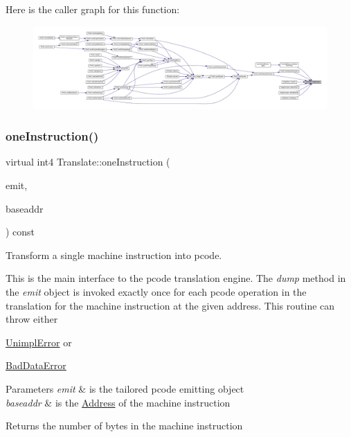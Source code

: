 Here is the caller graph for this function\+:
\nopagebreak
\begin{figure}[H]
\begin{center}
\leavevmode
\includegraphics[width=350pt]{class_translate_acd3fd0f02883a26e882c46872324adb8_icgraph}
\end{center}
\end{figure}
\mbox{\label{class_translate_a1737782c38ee43de62ae2e7572321fc9}} 
\subsubsection{\texorpdfstring{oneInstruction()}{oneInstruction()}}
{\footnotesize\ttfamily virtual int4 Translate\+::one\+Instruction (\begin{DoxyParamCaption}\item[{\mbox{\hyperlink{class_pcode_emit}{Pcode\+Emit}} \&}]{emit,  }\item[{const \mbox{\hyperlink{class_address}{Address}} \&}]{baseaddr }\end{DoxyParamCaption}) const\hspace{0.3cm}{\ttfamily [pure virtual]}}



Transform a single machine instruction into pcode. 

This is the main interface to the pcode translation engine. The {\itshape dump} method in the {\itshape emit} object is invoked exactly once for each pcode operation in the translation for the machine instruction at the given address. This routine can throw either
\begin{DoxyItemize}
\item \mbox{\hyperlink{struct_unimpl_error}{Unimpl\+Error}} or
\item \mbox{\hyperlink{struct_bad_data_error}{Bad\+Data\+Error}}
\end{DoxyItemize}


\begin{DoxyParams}{Parameters}
{\em emit} & is the tailored pcode emitting object \\
\hline
{\em baseaddr} & is the \mbox{\hyperlink{class_address}{Address}} of the machine instruction \\
\hline
\end{DoxyParams}
\begin{DoxyReturn}{Returns}
the number of bytes in the machine instruction 
\end{DoxyReturn}


